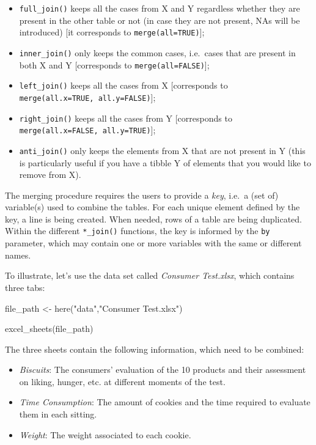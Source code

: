 \documentclass[
]{book}
\newenvironment{Shaded}{\begin{snugshade}}{\end{snugshade}}
\newcommand{\FunctionTok}[1]{\textcolor[rgb]{0.00,0.00,0.00}{#1}}
\newcommand{\NormalTok}[1]{#1}
\newcommand{\OtherTok}[1]{\textcolor[rgb]{0.56,0.35,0.01}{#1}}
\newcommand{\StringTok}[1]{\textcolor[rgb]{0.31,0.60,0.02}{#1}}
\providecommand{\tightlist}{%
  \setlength{\itemsep}{0pt}\setlength{\parskip}{0pt}}
\begin{document}
\begin{itemize}
\tightlist
\item
  \texttt{full\_join()} keeps all the cases from X and Y regardless whether they are present in the other table or not (in case they are not present, NAs will be introduced) {[}it corresponds to \texttt{merge(all=TRUE)}{]};
\item
  \texttt{inner\_join()} only keeps the common cases, i.e.~cases that are present in both X and Y {[}corresponds to \texttt{merge(all=FALSE)}{]};
\item
  \texttt{left\_join()} keeps all the cases from X {[}corresponds to \texttt{merge(all.x=TRUE,\ all.y=FALSE)}{]};
\item
  \texttt{right\_join()} keeps all the cases from Y {[}corresponds to \texttt{merge(all.x=FALSE,\ all.y=TRUE)}{]};
\item
  \texttt{anti\_join()} only keeps the elements from X that are not present in Y (this is particularly useful if you have a tibble Y of elements that you would like to remove from X).
\end{itemize}

The merging procedure requires the users to provide a \emph{key}, i.e.~a (set of) variable(s) used to combine the tables. For each unique element defined by the key, a line is being created. When needed, rows of a table are being duplicated. Within the different \texttt{*\_join()} functions, the key is informed by the \texttt{by} parameter, which may contain one or more variables with the same or different names.

To illustrate, let's use the data set called \emph{Consumer Test.xlsx}, which contains three tabs:

\begin{Shaded}
\begin{Highlighting}[]
\NormalTok{file\_path }\OtherTok{\textless{}{-}} \FunctionTok{here}\NormalTok{(}\StringTok{"data"}\NormalTok{,}\StringTok{"Consumer Test.xlsx"}\NormalTok{)}

\FunctionTok{excel\_sheets}\NormalTok{(file\_path)}
\end{Highlighting}
\end{Shaded}

The three sheets contain the following information, which need to be combined:

\begin{itemize}
\tightlist
\item
  \emph{Biscuits}: The consumers' evaluation of the 10 products and their assessment on liking, hunger, etc. at different moments of the test.
\item
  \emph{Time Consumption}: The amount of cookies and the time required to evaluate them in each sitting.
\item
  \emph{Weight}: The weight associated to each cookie.
\end{itemize}
\end{document}
